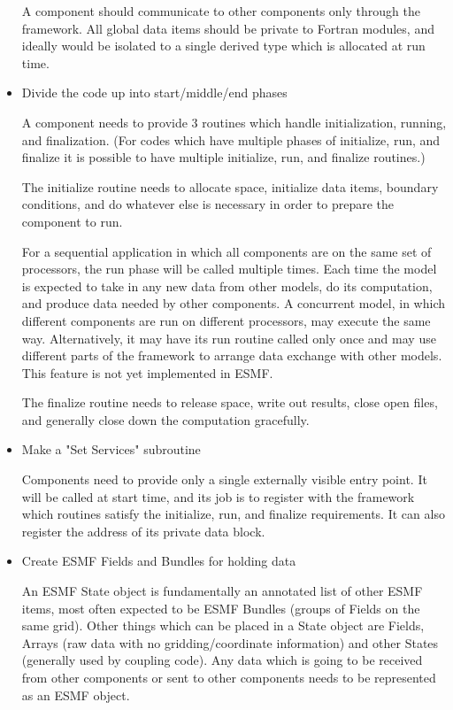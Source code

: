 \begin{itemize}
A component should communicate to other components only through the
framework.  All global data items should be private to Fortran modules,
and ideally would be isolated to a single derived type which is allocated
at run time.   

\item Divide the code up into start/middle/end phases 

A component needs to provide 3 routines which handle
initialization, running, and finalization.  (For codes which have
multiple phases of initialize, run, and finalize it is possible to have
multiple initialize, run, and finalize routines.)

The initialize routine needs to allocate space, initialize
data items, boundary conditions, and do whatever else is necessary in
order to prepare the component to run.

For a sequential application in which all components are on the same
set of processors, the run phase will
be called multiple times.  Each time the model is expected to take in
any new data from other models, do its computation, and produce data
needed by other components.   A concurrent model, in which different
components are run on different processors, may execute the same 
way.  Alternatively, it may have its run routine called
only once and may use different parts of the framework to arrange
data exchange with other models.  This feature is not yet implemented
in ESMF.

The finalize routine needs to release space, write out results,
close open files, and generally close down the computation gracefully.

\item Make a "Set Services" subroutine 

Components need to provide only a single externally visible entry point.
It will be called at start time, and its job is to register with the
framework which routines satisfy the initialize, run, and finalize
requirements.  It can also register the address of its private data block.

\item Create ESMF Fields and Bundles for holding data

An ESMF State object is fundamentally an annotated list of other
ESMF items, most often expected to be ESMF Bundles (groups of
Fields on the same grid).  Other things which can be placed in a 
State object are Fields, Arrays (raw data with no gridding/coordinate 
information)
and other States (generally used by coupling code).  Any data which is
going to be received from other components or sent to other components
needs to be represented as an ESMF object.


\end{itemize}
